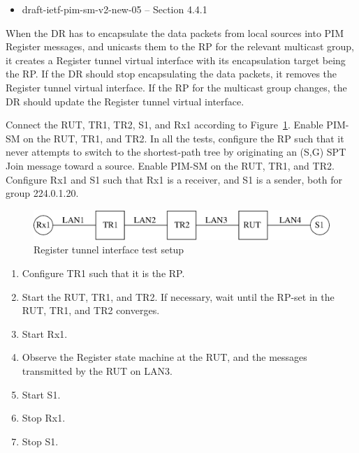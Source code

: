 \documentclass[11pt]{report}
\begin{document}
\begin{itemize}
  \item draft-ietf-pim-sm-v2-new-05 -- Section 4.4.1
\end{itemize}

When the DR has to encapsulate the data packets from local sources into
PIM Register messages, and unicasts them to the RP for the relevant multicast
group, it creates a Register tunnel virtual interface with its encapsulation
target being the RP. If the DR should stop encapsulating the data packets, it
removes the Register tunnel virtual interface. If the RP for the multicast
group changes, the DR should update the Register tunnel virtual interface.

Connect the RUT, TR1, TR2, S1, and Rx1 according to
Figure~\ref{fig:register_tunnel_interface}.
Enable PIM-SM on the RUT, TR1,
and TR2. In all the tests, configure the RP such that it never attempts to
switch to the shortest-path tree by originating an (S,G) SPT Join message
toward a source. Enable PIM-SM on the RUT, TR1, and TR2.  Configure Rx1 and S1
such that Rx1 is a receiver, and S1 is a sender, both for group 224.0.1.20.


\begin{figure}[htbp]
  \begin{center}
    \includegraphics[scale=0.8]{figs/pim_test_3_2_register_tunnel_interface}
    \caption{Register tunnel interface test setup}
    \label{fig:register_tunnel_interface}
  \end{center}
\end{figure}



\begin{enumerate}

  \item Configure TR1 such that it is the RP.

  \item Start the RUT, TR1, and TR2. If necessary, wait until the RP-set in
  the RUT, TR1, and TR2 converges.

  \item Start Rx1.

  \item Observe the Register state machine at the RUT, and the messages
  transmitted by the RUT on LAN3.

  \item Start S1.

  \item Stop Rx1.

  \item Stop S1.

\end{enumerate}
\end{document}
